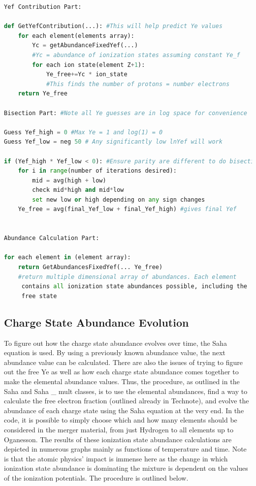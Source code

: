 \documentclass[11pt,a4paper]{article}
\begin{document}
\begin{lstlisting}[language=Python]
Yef Contribution Part: 

def GetYefContribution(...): #This will help predict Ye values
	for each element(elements array): 
		Yc = getAbundanceFixedYef(...)
		#Yc = abundance of ionization states assuming constant Ye_f
		for each ion state(element Z+1):
			Ye_free+=Yc * ion_state
			#This finds the number of protons = number electrons
	return Ye_free
			
Bisection Part: #Note all Ye guesses are in log space for convenience

Guess Yef_high = 0 #Max Ye = 1 and log(1) = 0
Guess Yef_low = neg 50 # Any significantly low lnYef will work

if (Yef_high * Yef_low < 0): #Ensure parity are different to do bisection
	for i in range(number of iterations desired):
		mid = avg(high + low)
		check mid*high and mid*low 
		set new low or high depending on any sign changes		
	Ye_free = avg(final_Yef_low + final_Yef_high) #gives final Yef
	
	
Abundance Calculation Part:

for each element in (element array):
	return GetAbundancesFixedYef(... Ye_free)
	#return multiple dimensional array of abundances. Each element
	 contains all ionization state abundances possible, including the
	 free state 
\end{lstlisting}

\vspace{.5 cm}





\subsection{Charge State Abundance Evolution}

To figure out how the charge state abundance evolves over time, the Saha equation is used. By using a previously known abundance value, the next abundance value can be calculated. There are also the issues of trying to figure out the free Ye as well as how each charge state abundance comes together to make the elemental abundance values. Thus, the procedure, as outlined in the Saha  and Saha \_ mult classes, is to use the elemental abundances, find a way to calculate the free electron fraction (outlined already in Technote), and evolve the abundance of each charge state using the Saha equation at the very end. 
In the code, it is possible to simply choose which and how many elements should be considered in the merger material, from just Hydrogen to all elements up to Oganesson. The results of these ionization state abundance calculations are depicted in numerous graphs mainly as functions of temperature and time. Note is that the atomic physics’ impact is immense here as the change in which ionization state abundance is dominating the mixture is dependent on the values of the ionization potentials. The procedure is outlined below.
\pagebreak
\end{document}
